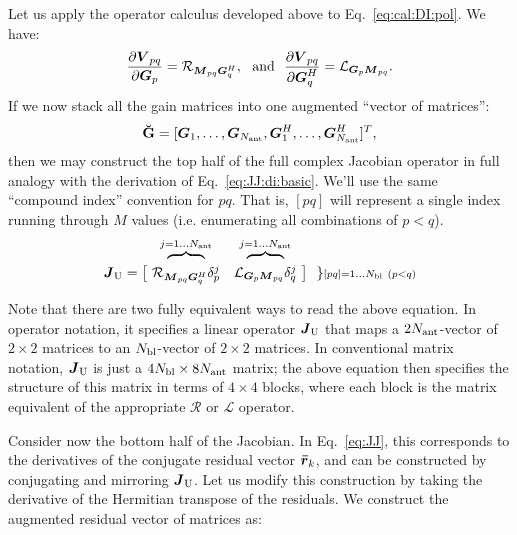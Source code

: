 \documentclass[useAMS,usenatbib]{mn2e}
\newcommand{\rrc}{\bmath{\bar r}}
\newcommand{\mat}[1]{{\bmath{#1}}}
\newcommand{\JJ}{\mat{J}} %
\newcommand{\MM}{\mat{M}}
\newcommand{\VV}{\mat{V}}
\newcommand{\GG}{\mat{G}}
\newcommand{\AUGx}[1]{\mathbf{\breve{#1}}}
\newcommand{\GGg}{\AUGx{G}}
\newcommand{\TOP}{\mathrm{U}}%
\newcommand{\Rop}[1]{\mathcal{R}_{{#1}}}
\newcommand{\Lop}[1]{\mathcal{L}_{{#1}}}
\numberwithin{equation}{section} %
\providecommand{\DIFaddend}{} %
\providecommand{\DIFdelbegin}{} %
\begin{document}
Let us apply the operator calculus developed above to Eq.~\ref{eq:cal:DI:pol}. We have:
\begin{equation}
\label{eq:dR:dG}
\frac{\partial\VV_{pq}}{\partial\GG_p} = \Rop{\MM_{pq}\GG^H_q},\mathrm{~~and~~}
\frac{\partial\VV_{pq}}{\partial\GG^H_q} = \Lop{\GG_p \MM_{pq}}.
\end{equation}
If we now stack all the gain matrices into one augmented ``vector of matrices'':
\begin{equation}
\label{eq:GGvec}
\GGg = [ \GG_1,\dots,\GG_{\scriptstyle \Na},\GG^H_1,\dots,\GG^H_{\scriptstyle \Na} ]^T,
\end{equation}
then we may construct the top half of the full complex Jacobian operator in full analogy with the 
derivation of Eq.~\ref{eq:JJ:di:basic}. We'll use the same ``compound index'' convention for $pq$. That is, 
$[pq]$ will represent a single index running through $M$ values (i.e. enumerating all combinations of $p<q$).
\begin{equation}
\label{eq:JJtop}
\begin{array}{r@{~}cc@{~}cc}
  & \overbrace{~~~~~~~~}^{j=1\dots \Na} & \overbrace{~~~~~~~~}^{j=1\dots \Na} \\

\JJ_\TOP = \big [ & 
\Rop{ \MM_{pq}\GG^H_q }\delta^j_p & 
\Lop{ \GG_p \MM_{pq}  }\delta^j_q 
& \big ] ~~ \} \DIFaddend \scriptstyle [pq]=1\dots \Nbl~(p<q)
% 
\end{array}
\end{equation}

Note that there are two fully equivalent ways to read the above equation. In operator notation, it specifies a linear operator 
$\JJ_\TOP$
that maps a $2N_\mathrm{ant}$-vector of $2\times2$ matrices to an $N_\mathrm{bl}$-vector of $2\times2$ matrices. In conventional matrix notation, 
$\JJ_\TOP$ is just a $4N_\mathrm{bl}\times8N_\mathrm{ant}$ matrix; the above equation then specifies the structure of this matrix in terms
of $4\times4$ blocks, where each block is the matrix equivalent of the appropriate $\mathcal{R}$ or $\mathcal{L}$ operator.

Consider now the bottom half of the Jacobian. In Eq.~\ref{eq:JJ}, this corresponds to the derivatives of the conjugate residual
vector $\rrc_k$, and can be constructed by conjugating and mirroring $\JJ_\TOP$. Let us modify this construction 
by taking the derivative of the Hermitian transpose of the residuals. We construct the augmented residual vector of matrices
as:
\DIFdelbegin %
\end{document}
